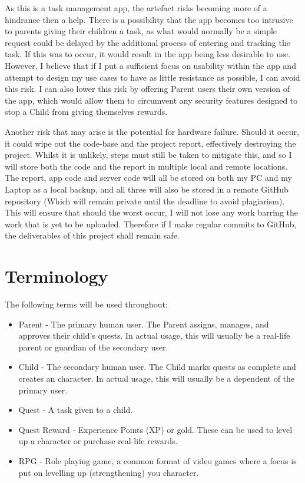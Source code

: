 As this is a task management app, the artefact risks becoming more of a hindrance then a help.
There is a possibility that the app becomes too intrusive to parents giving their children a task, as what would normally be a simple request could be delayed by the additional process of entering and tracking the task.
If this was to occur, it would result in the app being less desirable to use.
However, I believe that if I put a sufficient focus on usability within the app and attempt to design my use cases to have as little resistance as possible, I can avoid this risk.
I can also lower this risk by offering Parent users their own version of the app, which would allow them to circumvent any security features designed to stop a Child from giving themselves rewards. 

Another risk that may arise is the potential for hardware failure. 
Should it occur, it could wipe out the code-base and the project report, effectively destroying the project. 
Whilst it is unlikely, steps must still be taken to mitigate this, and so I will store both the code and the report in multiple local and remote locations.
The report, app code and server code will all be stored on both my PC and my Laptop as a local backup, and all three will also be stored in a remote GitHub repository (Which will remain private until the deadline to avoid plagiarism).
This will ensure that should the worst occur, I will not lose any work barring the work that is yet to be uploaded.
Therefore if I make regular commits to GitHub, the deliverables of this project shall remain safe. 

\section{Terminology}

The following terms will be used throughout:

\begin{itemize}
	\item Parent - The primary human user. The Parent assigns, manages, and approves their child's quests. In actual usage, this will usually be a real-life parent or guardian of the secondary user. 
	\item Child - The secondary human user. The Child marks quests as complete and creates an character. In actual usage, this will usually be a dependent of the primary user. 
	\item Quest - A task given to a child.
	\item Quest Reward - Experience Points (XP) or gold. These can be used to level up a character or purchase real-life rewards.
	\item RPG - Role playing game, a common format of video games where a focus is put on levelling up (strengthening) you character.
\end{itemize}
